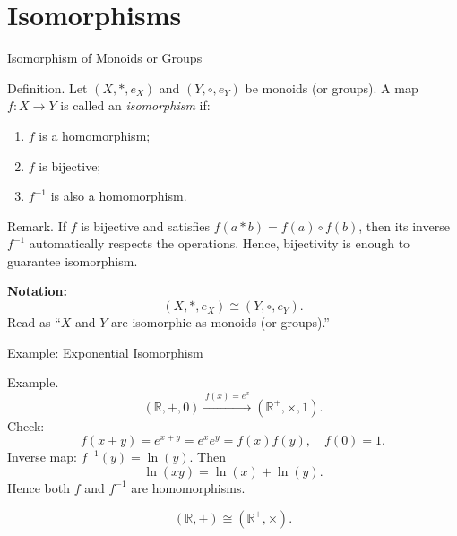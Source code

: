 \section{Isomorphisms}

\begin{frame}{Isomorphism of Monoids or Groups}
\vspace{-0.3cm}
\begin{block}{Definition.}  
Let $(X, *, e_X)$ and $(Y, \circ, e_Y)$ be monoids (or groups).  
A map \(f:X\to Y\) is called an \emph{isomorphism} if:
\begin{enumerate}
    \item \(f\) is a homomorphism;
    \item \(f\) is bijective;
    \item \(f^{-1}\) is also a homomorphism.
\end{enumerate}
\end{block}
\vspace{-0.3cm}
\begin{block}{Remark.}
If \(f\) is bijective and satisfies \(f(a*b)=f(a)\circ f(b)\), then its inverse \(f^{-1}\) automatically respects the operations.  
Hence, bijectivity is enough to guarantee isomorphism.

\textbf{Notation:}
\[
(X, *, e_X) \cong (Y, \circ, e_Y).
\]
Read as “\(X\) and \(Y\) are isomorphic as monoids (or groups).”
\end{block}
\end{frame}

\begin{frame}{Example: Exponential Isomorphism}
\vspace{-0.3cm}
\begin{block}{Example.}
\[
(\mathbb{R}, +, 0) \xrightarrow{\,f(x)=e^x\,} (\mathbb{R}^+, \times, 1).
\]
Check:
\[
f(x+y)=e^{x+y}=e^x e^y=f(x)f(y),\quad f(0)=1.
\]
Inverse map: \(f^{-1}(y)=\ln(y)\).  
Then
\[
\ln(xy)=\ln(x)+\ln(y).
\]
Hence both \(f\) and \(f^{-1}\) are homomorphisms.

\[
(\mathbb{R}, +) \cong (\mathbb{R}^+, \times).
\]
\end{block}
\end{frame}



